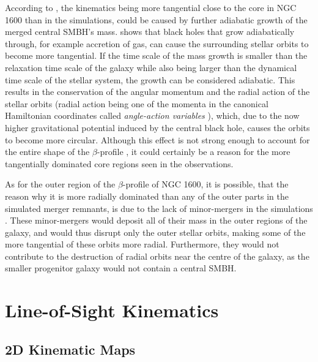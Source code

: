\documentclass[english, oneside]{HYgradu}
\begin{document}
According to \cite{Rantala2018}, the kinematics being more tangential close to the core in NGC 1600 than in the simulations, could be caused by further adiabatic growth of the merged central SMBH's mass. \cite{Young1980} shows that black holes that grow adiabatically through, for example accretion of gas, can cause the surrounding stellar orbits to become more tangential. If the time scale of the mass growth is smaller than the relaxation time scale of the galaxy while also being larger than the dynamical time scale of the stellar system, the growth can be considered adiabatic. This results in the conservation of the angular momentum and the radial action of the stellar orbits (radial action being one of the momenta in the canonical Hamiltonian coordinates called \textit{angle-action variables} \citep[e.g.][]{BinneyTremaine}), which, due to the now higher gravitational potential induced by the central black hole, causes the orbits to become more circular. Although this effect is not strong enough to account for the entire shape of the $\beta$-profile \citep{Thomas2016}, it could certainly be a reason for the more tangentially dominated core regions seen in the observations.

As for the outer region of the $\beta$-profile of NGC 1600, it is possible, that the reason why it is more radially dominated than any of the outer parts in the simulated merger remnants, is due to the lack of minor-mergers in the simulations \citep{Rantala2018}. These minor-mergers would deposit all of their mass in the outer regions of the galaxy, and would thus disrupt only the outer stellar orbits, making some of the more tangential of these orbits more radial. Furthermore, they would not contribute to the destruction of radial orbits near the centre of the galaxy, as the smaller progenitor galaxy would not contain a central SMBH.

\section{Line-of-Sight Kinematics}

\subsection{2D Kinematic Maps}
\end{document}
